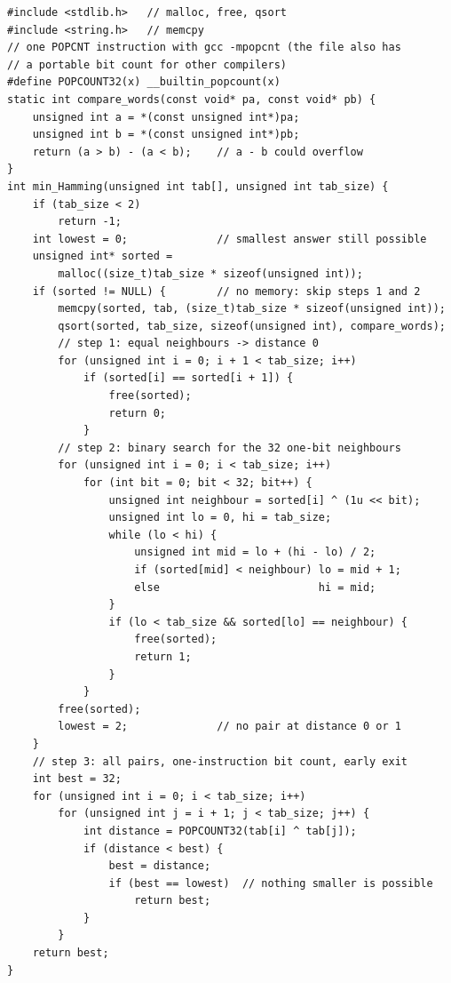 \documentclass[conference,a4paper]{IEEEtran}
\begin{document}
\begin{lstlisting}[float=t,caption={min\_hamming\_v2.c (comments shortened)},label={lst:v2}]
#include <stdlib.h>   // malloc, free, qsort
#include <string.h>   // memcpy
// one POPCNT instruction with gcc -mpopcnt (the file also has
// a portable bit count for other compilers)
#define POPCOUNT32(x) __builtin_popcount(x)
static int compare_words(const void* pa, const void* pb) {
    unsigned int a = *(const unsigned int*)pa;
    unsigned int b = *(const unsigned int*)pb;
    return (a > b) - (a < b);    // a - b could overflow
}
int min_Hamming(unsigned int tab[], unsigned int tab_size) {
    if (tab_size < 2)
        return -1;
    int lowest = 0;              // smallest answer still possible
    unsigned int* sorted =
        malloc((size_t)tab_size * sizeof(unsigned int));
    if (sorted != NULL) {        // no memory: skip steps 1 and 2
        memcpy(sorted, tab, (size_t)tab_size * sizeof(unsigned int));
        qsort(sorted, tab_size, sizeof(unsigned int), compare_words);
        // step 1: equal neighbours -> distance 0
        for (unsigned int i = 0; i + 1 < tab_size; i++)
            if (sorted[i] == sorted[i + 1]) {
                free(sorted);
                return 0;
            }
        // step 2: binary search for the 32 one-bit neighbours
        for (unsigned int i = 0; i < tab_size; i++)
            for (int bit = 0; bit < 32; bit++) {
                unsigned int neighbour = sorted[i] ^ (1u << bit);
                unsigned int lo = 0, hi = tab_size;
                while (lo < hi) {
                    unsigned int mid = lo + (hi - lo) / 2;
                    if (sorted[mid] < neighbour) lo = mid + 1;
                    else                         hi = mid;
                }
                if (lo < tab_size && sorted[lo] == neighbour) {
                    free(sorted);
                    return 1;
                }
            }
        free(sorted);
        lowest = 2;              // no pair at distance 0 or 1
    }
    // step 3: all pairs, one-instruction bit count, early exit
    int best = 32;
    for (unsigned int i = 0; i < tab_size; i++)
        for (unsigned int j = i + 1; j < tab_size; j++) {
            int distance = POPCOUNT32(tab[i] ^ tab[j]);
            if (distance < best) {
                best = distance;
                if (best == lowest)  // nothing smaller is possible
                    return best;
            }
        }
    return best;
}
\end{lstlisting}
\end{document}

